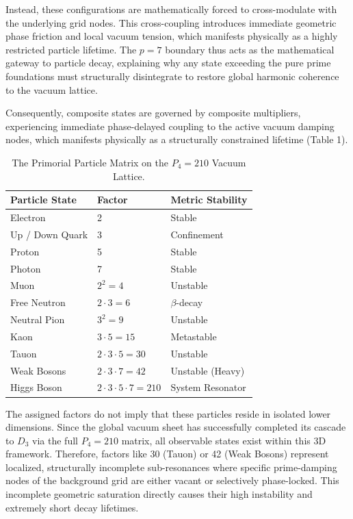 \documentclass[twocolumn]{aa}
\begin{document}
Instead, these configurations are mathematically forced to cross-modulate with the underlying grid nodes. This cross-coupling introduces immediate geometric phase friction and local vacuum tension, which manifests physically as a highly restricted particle lifetime. The $p=7$ boundary thus acts as the mathematical gateway to particle decay, explaining why any state exceeding the pure prime foundations must structurally disintegrate to restore global harmonic coherence to the vacuum lattice.

Consequently, composite states are governed by composite multipliers, experiencing immediate phase-delayed coupling to the active vacuum damping nodes, which manifests physically as a structurally constrained lifetime (Table 1).

\begin{table}[h]
\centering
\caption{The Primorial Particle Matrix on the $P_4 = 210$ Vacuum Lattice.}
\begin{tabular}{ll p{3.2cm}}
\toprule
\textbf{Particle State} & \textbf{Factor} & \textbf{Metric Stability} \\ \midrule
Electron        & 2                         & Stable \\
Up / Down Quark & 3                         & Confinement \\
Proton          & 5                         & Stable \\
Photon          & 7                         & Stable \\
Muon            & $2^2 = 4$                 & Unstable \\
Free Neutron    & $2 \cdot 3 = 6$           & $\beta$-decay \\
Neutral Pion    & $3^2 = 9$                 & Unstable \\
Kaon            & $3 \cdot 5 = 15$          & Metastable \\
Tauon           & $2 \cdot 3 \cdot 5 = 30$  & Unstable \\
Weak Bosons     & $2 \cdot 3 \cdot 7 = 42$  & Unstable (Heavy) \\
Higgs Boson     & $2 \cdot 3 \cdot 5 \cdot 7 = 210$ & System Resonator \\ \bottomrule
\end{tabular}
\end{table}

\bigskip
{} The assigned factors do not imply that these particles reside in isolated lower dimensions. Since the global vacuum sheet has successfully completed its cascade to $D_3$ via the full $P_4=210$ matrix, all observable states exist within this 3D framework. Therefore, factors like 30 (Tauon) or 42 (Weak Bosons) represent localized, structurally incomplete sub-resonances where specific prime-damping nodes of the background grid are either vacant or selectively phase-locked. This incomplete geometric saturation directly causes their high instability and extremely short decay lifetimes.
\end{document}
